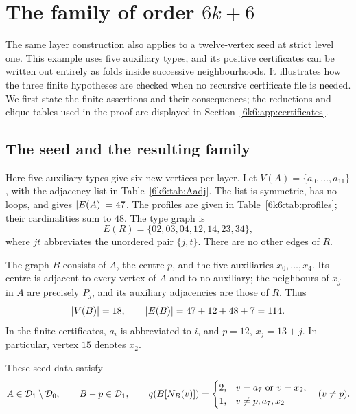 \section{The family of order \texorpdfstring{$6k+6$}{6k+6}}\label{sec:family6}
The same layer construction also applies to a twelve-vertex seed at strict
level one. This example uses five auxiliary types, and its positive
certificates can be written out entirely as folds inside successive
neighbourhoods. It illustrates how the three finite hypotheses are checked
when no recursive certificate file is needed.
We first state the finite assertions and their consequences; the reductions
and clique tables used in the proof are displayed in
Section~\ref{6k6:app:certificates}.

\subsection{The seed and the resulting family}\label{6k6:sec:seed}
Here five auxiliary types give six new vertices per layer. Let
\(V(A)=\{a_0,\ldots,a_{11}\}\), with the adjacency list in
Table~\ref{6k6:tab:Aadj}. The list is symmetric, has no loops, and gives
\(\lvert E(A)\rvert=47\). The profiles are given in Table~\ref{6k6:tab:profiles};
their cardinalities sum to \(48\). The type graph is
\begin{equation}\label{6k6:eq:R}
 E(R)=\{02,03,04,12,14,23,34\},
\end{equation}
where \(jt\) abbreviates the unordered pair \(\{j,t\}\).
There are no other edges of \(R\).


The graph \(B\) consists of \(A\), the centre \(p\), and the five
auxiliaries \(x_0,\ldots,x_4\). Its centre is adjacent to every vertex
of \(A\) and to no auxiliary; the neighbours of \(x_j\) in \(A\)
are precisely \(P_j\), and its auxiliary adjacencies are those of \(R\).
Thus
\[
 \lvert V(B)\rvert=18,\qquad
 \lvert E(B)\rvert=47+12+48+7=114.
\]
In the finite certificates, \(a_i\) is abbreviated to \(i\), and
\(p=12\), \(x_j=13+j\). In particular, vertex \(15\) denotes \(x_2\).
\begin{proposition}\label{6k6:prop:seed}
These seed data satisfy
\[
 A\in\mathcal D_1\setminus\mathcal D_0,\qquad B-p\in\mathcal D_1,\qquad
 q(B[N_B(v)])=
 \begin{cases}
 2,&v=a_7\text{ or }v=x_2,\\
 1,&v\ne p,a_7,x_2
 \end{cases}
 \quad(v\ne p).
\]
\end{proposition}
